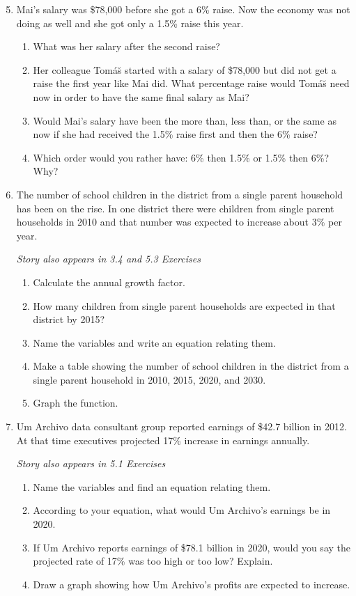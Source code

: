 \begin{enumerate} 
\setcounter{enumi}{4}

\item Mai's salary was \$78,000 before she got a 6\% raise.  Now the economy was not doing as well and she got only a 1.5\% raise this year.
\begin{enumerate}
\item What was her salary after the second raise?
\item Her colleague Tom\'a\u s started with a salary of \$78,000 but did not get a raise the first year like Mai did.  What percentage raise would Tom\'a\u s need now in order to have the same final salary as Mai?
\item Would Mai's salary have been the more than, less than, or the same as now if she had received the 1.5\% raise first and then the 6\% raise?
\item Which order would you rather have:  6\% then 1.5\% or 1.5\% then 6\%?  Why?
\end{enumerate}

\item The number of school children in the district from a single parent household has been on the rise.  In one district there were  children from single parent households in 2010 and that number was expected to increase about 3\% per year.

\hfill \emph{Story also appears in 3.4 and 5.3 Exercises}
\begin{enumerate}
\item Calculate the annual growth factor.
\item How many children from single parent households are expected in that district by 2015?
\item Name the variables and write an equation relating them.
\item Make a table showing the number of school children in the district from a single parent household in 2010, 2015, 2020, and 2030.
\item Graph the function.  
\end{enumerate}

\item Um Archivo data consultant group reported earnings of \$42.7 billion in 2012.  At that time executives projected 17\% increase in earnings annually. 

 \hfill \emph{Story also appears in 5.1 Exercises}
\begin{enumerate}
\item Name the variables and find an equation relating them.
\item According to your equation, what would Um Archivo's earnings be in 2020.
\item If Um Archivo reports earnings of \$78.1 billion in 2020, would you say the projected rate of 17\% was too high or too low?  Explain.
\item Draw a graph showing how Um Archivo's profits are expected to increase.
\end{enumerate}  


\end{enumerate}
